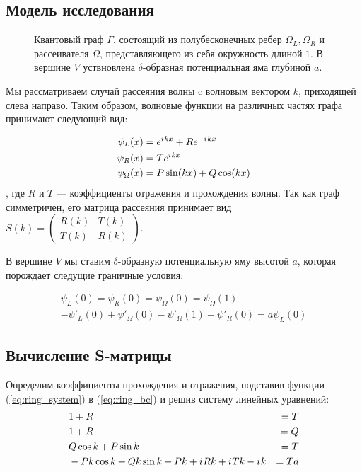 \subsection{Модель исследования}
\begin{figure}[!htb] %
\centering
\begin{tikzpicture}[scale=1.1] %

\end{tikzpicture}
\caption{Квантовый граф $\Gamma$, состоящий из полубесконечных ребер $\Omega_L, \Omega_R$ и рассеивателя $\Omega$, представляющего из себя окружность длиной $1$. В вершине $V$ уствновлена $\delta$-образная потенциальная яма глубиной $a$.}
\end{figure}

Мы рассматриваем случай рассеяния волны c волновым вектором $k$, приходящей слева направо. Таким образом, волновые функции на различных частях графа принимают следующий вид:

\begin{equation}\label{eq:ring_system}
\begin{aligned}
\psi_L(x) &= \eexp{\iu k x} + R \eexp{-\iu k x} \\
\psi_R(x) &= T \eexp{\iu k x}\\
\psi_\Omega(x) &= P \sin(k x) + Q \cos(k x)
\end{aligned}
\end{equation}
, где $R$ и $T$ — коэффициенты отражения и прохождения волны. Так как граф симметричен, его матрица рассеяния принимает вид
$S(k) = \begin{pmatrix} R(k) & T(k) \\ T(k) & R(k) \end{pmatrix}$.

В вершине $V$ мы ставим $\delta$-образную потенциальную яму высотой $a$, которая порождает следущие граничные условия:

\begin{equation}\label{eq:ring_bc}
\begin{aligned}
\psi_L(0) = \psi_R(0) = \psi_\Omega(0) = \psi_\Omega(1) \\ 
-\psi'_L(0) + \psi'_\Omega(0) - \psi'_\Omega(1) + \psi'_R(0) = a \psi_L(0)
\end{aligned}
\end{equation}


\subsection{Вычисление S-матрицы}
Определим коэффициенты прохождения и отражения, подставив функции (\ref{eq:ring_system}) в (\ref{eq:ring_bc}) и решив систему линейных уравнений:
\begin{align*}
& 1 + R &= T \\
& 1 + R &= Q \\
& Q \cos k + P \sin k &= T \\
& -P k \cos k + Q k \sin k + P k + \iu R k + \iu T k - \iu k &= T a
\end{align*}

